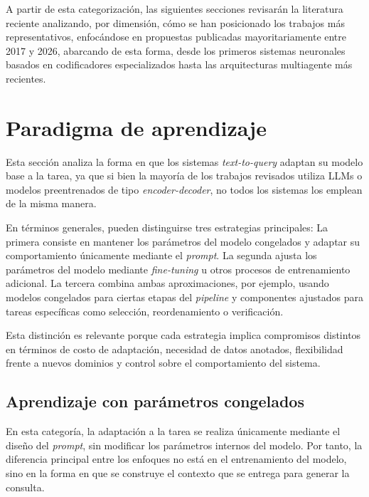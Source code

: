 A partir de esta categorización, las siguientes secciones revisarán la literatura reciente analizando, por dimensión, cómo se han posicionado los trabajos más representativos, enfocándose en propuestas publicadas mayoritariamente entre 2017 y 2026, abarcando de esta forma, desde los primeros sistemas neuronales basados en codificadores especializados hasta las arquitecturas multiagente más recientes.

\section{Paradigma de aprendizaje}
\label{sec:sota-d1-aprendizaje}

Esta sección analiza la forma en que los sistemas \emph{text-to-query} adaptan su modelo base a la tarea, ya que si bien la mayoría de los trabajos revisados utiliza \acp{LLM} o modelos preentrenados de tipo \emph{encoder-decoder}, no todos los sistemas los emplean de la misma manera.









En términos generales, pueden distinguirse tres estrategias principales: La primera consiste en mantener los parámetros del modelo congelados y adaptar su comportamiento únicamente mediante el \emph{prompt}. La segunda ajusta los parámetros del modelo mediante \emph{fine-tuning} u otros procesos de entrenamiento adicional. La tercera combina ambas aproximaciones, por ejemplo, usando modelos congelados para ciertas etapas del \emph{pipeline} y componentes ajustados para tareas específicas como selección, reordenamiento o verificación.

Esta distinción es relevante porque cada estrategia implica compromisos distintos en términos de costo de adaptación, necesidad de datos anotados, flexibilidad frente a nuevos dominios y control sobre el comportamiento del sistema.

\subsection{Aprendizaje con parámetros congelados}
\label{subsec:sota-d1-frozen}

En esta categoría, la adaptación a la tarea se realiza únicamente mediante el diseño del \emph{prompt}, sin modificar los parámetros internos del modelo. Por tanto, la diferencia principal entre los enfoques no está en el entrenamiento del modelo, sino en la forma en que se construye el contexto que se entrega para generar la consulta.

